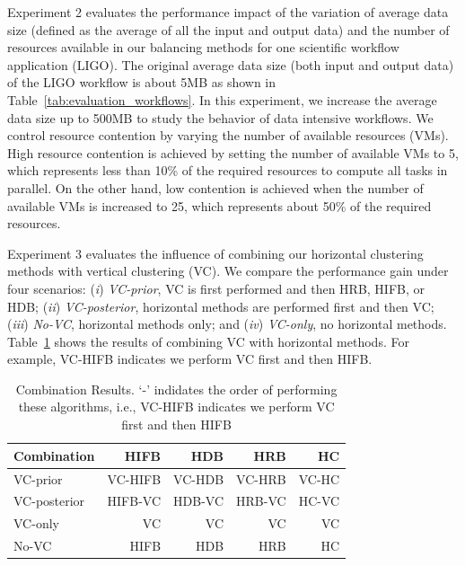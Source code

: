 Experiment 2 evaluates the performance impact of the variation of average data size (defined as the average of all the input and output data) and the number of resources available in our balancing methods for one scientific workflow application (LIGO). The original average data size (both input and output data) of the LIGO workflow is about 5MB as shown in Table~\ref{tab:evaluation_workflows}. In this experiment, we increase the average data size up to 500MB to study the behavior of data intensive workflows. We control resource contention by varying the number of available resources (VMs). High resource contention is achieved by setting the number of available VMs to 5, which represents less than 10\% of the required resources to compute all tasks in parallel. On the other hand, low contention is achieved when the number of available VMs is increased to 25, which represents about 50\% of the required resources.

Experiment 3 evaluates the influence of combining our horizontal clustering methods with vertical clustering (VC). We compare the performance gain under four scenarios: (\emph{i}) \emph{VC-prior}, VC is first performed and then HRB, HIFB, or HDB; (\emph{ii}) \emph{VC-posterior}, horizontal methods are performed first and then VC; (\emph{iii}) \emph{No-VC}, horizontal methods only; and (\emph{iv}) \emph{VC-only}, no horizontal methods. Table~\ref{tab:evaluation_vc_combination} shows the results of combining VC with horizontal methods. For example, VC-HIFB indicates we perform VC first and then HIFB. 

\begin{table}[!htb]
	\centering
	\small
	\begin{tabular}{l|rrrr}
		\hline
		Combination	& HIFB	 &  HDB & HRB & HC \\
		\hline
		VC-prior 		& VC-HIFB		& VC-HDB	& VC-HRB & VC-HC\\
		VC-posterior 		&HIFB-VC		&HDB-VC	&HRB-VC & HC-VC\\
		VC-only 	&VC		&VC 	& VC & VC\\
		No-VC 	&HIFB 	& HDB & HRB	& HC \\
		\hline
	\end{tabular}
	\caption{Combination Results. `-' indidates the order of performing these algorithms, i.e., VC-HIFB indicates we perform VC first and then HIFB}
	\label{tab:evaluation_vc_combination}
\end{table} 



